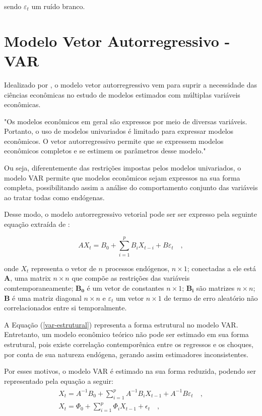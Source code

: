\noindent sendo $\varepsilon_t$ um ruído branco.


\section{Modelo Vetor Autorregressivo - VAR}

Idealizado por , o modelo vetor autorregressivo vem para suprir a necessidade das ciências econômicas no estudo de modelos estimados com múltiplas variáveis econômicas.

\begin{citacao}
"Os modelos econômicos em geral são expressos por meio de diversas variáveis. Portanto, o uso de modelos univariados é limitado para expressar modelos econômicos. O vetor autorregressivo permite que se expressem modelos econômicos completos e se estimem os parâmetros desse modelo."
\cite{bueno}
\end{citacao}

Ou seja, diferentemente das restrições impostas pelos modelos univariados, o modelo VAR permite que modelos econômicos sejam expressos na sua forma completa, possibilitando assim a análise do comportamento conjunto das variáveis ao tratar todas como endógenas.

Desse modo, o modelo autorregressivo vetorial pode ser ser expresso pela seguinte equação extraída de :

\begin{equation}\label{var-estrutural}
    AX_t = B_0 + \sum^p_{i=1} B_i X_{t-i} + B\varepsilon_t \quad,
\end{equation}

\noindent onde $X_t$ representa o vetor de $n$ processos endógenos, $n \times 1$; conectadas a ele está $\mathbf{A}$, uma matrix $n \times n$ que compõe as restrições das variáveis comtemporaneamente; $\mathbf{B_0}$ é um vetor de constantes $n \times 1$; $\mathbf{B_i}$ são matrizes $n \times n$; $\mathbf{B}$ é uma matriz diagonal $n \times n$ e $\varepsilon_t$ um vetor $n \times 1$ de termo de erro aleatório não correlacionados entre si temporalmente.

A Equação (\ref{var-estrutural}) representa a forma estrutural no modelo VAR. Entretanto, um modelo econômico teórico não pode ser estimado em sua forma estrutural, pois existe correlação contemporênica entre os regressos e os choques, por conta de sua natureza endógena, gerando assim estimadores inconsistentes. 

Por esses motivos, o modelo VAR é estimado na sua forma reduzida, podendo ser representado pela equação a seguir:
\begin{align}
\begin{split}
    X_t = A^{-1}B_0 + \sum^p_{i=1} A^{-1} B_i X_{t-1} + A^{-1} B\varepsilon_t \quad, \\
    X_t = \Phi_0 + \sum^p_{i=1} \Phi_i X_{t-1} + \epsilon_t \quad,
\end{split}
\end{align}

